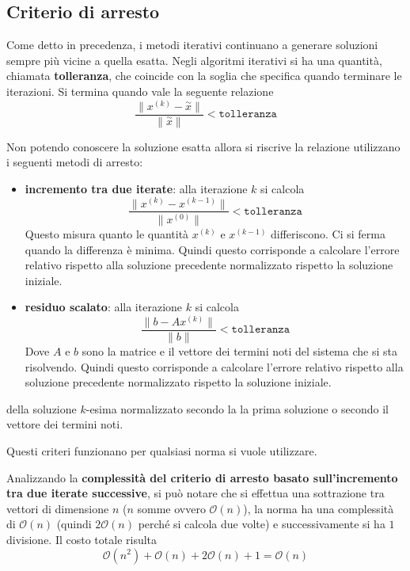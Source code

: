 \subsection{Criterio di arresto}
Come detto in precedenza, i metodi iterativi continuano a generare soluzioni sempre
più vicine a quella esatta.
Negli algoritmi iterativi si ha una quantità, chiamata \textbf{tolleranza}, che
coincide con la soglia che specifica quando terminare le iterazioni. Si termina
quando vale la seguente relazione
$$\frac{\|x^{(k)}-\stackrel{\sim}{x}\|}{\|\stackrel{\sim}{x}\|} < \texttt{tolleranza}$$

Non potendo conoscere la soluzione esatta allora si riscrive la relazione utilizzano i seguenti metodi
di arresto:
\begin{itemize}
    \item \textbf{incremento tra due iterate}: alla iterazione $k$ si calcola
          $$\frac{\|x^{(k)}-x^{(k-1)}\|}{\|x^{(0)}\|}< \texttt{tolleranza}$$
          Questo misura quanto le quantità $x^{(k)}$ e $x^{(k-1)}$ differiscono. Ci si
          ferma quando la differenza è minima. Quindi questo corrisponde a calcolare l'errore relativo rispetto alla soluzione
          precedente normalizzato rispetto la soluzione iniziale.
    \item \textbf{residuo scalato}: alla iterazione $k$ si calcola
          $$\frac{\|b- Ax^{(k)}\|}{\|b\|}< \texttt{tolleranza}$$
          Dove $A$ e $b$ sono la matrice e il vettore dei termini noti del sistema che
          si sta risolvendo. Quindi questo corrisponde a calcolare l'errore relativo rispetto alla soluzione
          precedente normalizzato rispetto la soluzione iniziale.

\end{itemize}

della soluzione $k$-esima
normalizzato secondo la la prima soluzione o secondo il vettore dei termini noti.

\begin{nota}
    Questi criteri funzionano per qualsiasi norma si vuole utilizzare.
\end{nota}

Analizzando la \textbf{complessità del criterio di arresto basato sull'incremento tra due
    iterate successive}, si può notare che si effettua una sottrazione tra vettori
di dimensione $n$ ($n$ somme ovvero $\mathcal{O}(n)$), la norma ha una complessità
di $\mathcal{O}(n)$ (quindi $2\mathcal{O}(n)$ perché si calcola due volte) e
successivamente si ha $1$ divisione.
Il costo totale risulta
$$\mathcal{O}(n^2)+ \mathcal{O}(n)+2\mathcal{O}(n)+1 = \mathcal{O}(n)$$

